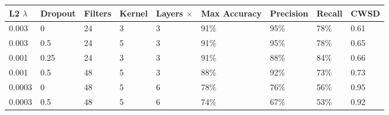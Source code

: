 \documentclass[10pt]{article}
\begin{document}
\begin{minipage}{\textwidth}
    \begin{center}
        \begin{tabular}{|l|l|l|l|l|l|l|l|l|}
            \hline
            L2 $\lambda$ & Dropout & Filters & Kernel & Layers $\times$ & Max Accuracy & Precision & Recall & CWSD \\
            \hline
            0.003 & 0 & 24 & 3 & 3 & 91\% & 95\% & 78\% & 0.61 \\
            \hline
            0.003 & 0.5 & 24 & 5 & 3 & 91\% & 95\% & 78\% & 0.65 \\
            \hline
            0.001 & 0.25 & 24 & 3 & 3 & 91\% & 88\% & 84\% & 0.66 \\
            \hline
            0.001 & 0.5 & 48 & 5 & 3 & 88\% & 92\% & 73\% & 0.73 \\
            \hline
            0.0003 & 0 & 48 & 5 & 6 & 78\% & 76\% & 56\% & 0.95 \\
            \hline
            0.0003 & 0.5 & 48 & 5 & 6 & 74\% & 67\% & 53\% & 0.92 \\
            \hline
        \end{tabular}
    \end{center}
\end{minipage}
\end{document}
